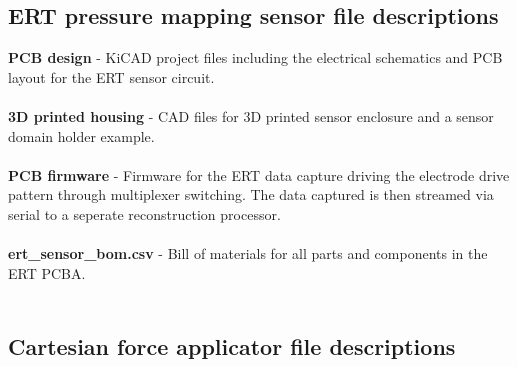\subsection{ERT pressure mapping sensor file descriptions}
\textbf{PCB design} - KiCAD project files including the electrical schematics and PCB layout for the ERT sensor circuit.
\\ \\
\textbf{3D printed housing} - CAD files for 3D printed sensor enclosure and a sensor domain holder example.
\\ \\
\textbf{PCB firmware} - Firmware for the ERT data capture driving the electrode drive pattern through multiplexer switching. The data captured is then streamed via serial to a seperate reconstruction processor.
\\ \\
\textbf{ert\_sensor\_bom.csv} - Bill of materials for all parts and components in the ERT PCBA.
\\ \\

\subsection{Cartesian force applicator file descriptions}

